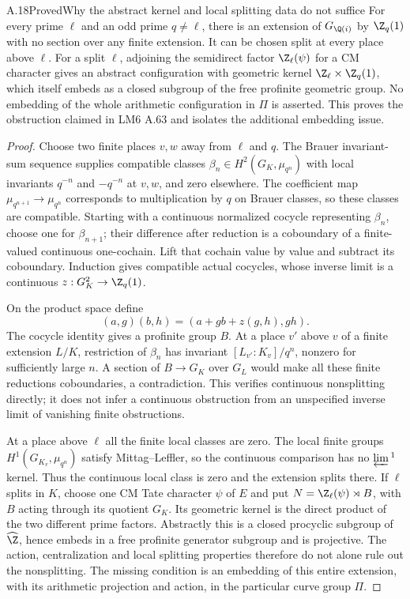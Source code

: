 \begin{statement}{A.18}{Proved}{Why the abstract kernel and local splitting data do not suffice}
For every prime $\ell$ and an odd prime $q\ne\ell$, there is
an extension of $G_{\Q(i)}$ by $\Z_q(1)$ with no section over
any finite extension. It can be chosen split at every place
above $\ell$. For a split $\ell$, adjoining the semidirect
factor $\Z_\ell(\psi)$ for a CM character gives an abstract
configuration with geometric kernel $\Z_\ell\times\Z_q(1)$,
which itself embeds as a closed subgroup of the free profinite
geometric group. No embedding of the whole arithmetic
configuration in $\Pi$ is asserted. This proves the obstruction
claimed in LM6 A.63 and isolates the additional embedding issue.
\end{statement}
\begin{proof}
Choose two finite places $v,w$ away from $\ell$ and $q$.
The Brauer invariant-sum sequence supplies compatible classes
$\beta_n\in H^2(G_K,\mu_{q^n})$ with local invariants
$q^{-n}$ and $-q^{-n}$ at $v,w$, and zero elsewhere.
The coefficient map $\mu_{q^{n+1}}\to\mu_{q^n}$ corresponds
to multiplication by $q$ on Brauer classes, so these classes
are compatible. Starting with a continuous normalized cocycle
representing $\beta_n$, choose one for $\beta_{n+1}$; their
difference after reduction is a coboundary of a finite-valued
continuous one-cochain. Lift that cochain value by value and
subtract its coboundary. Induction gives compatible actual
cocycles, whose inverse limit is a continuous
$z:G_K^2\to\Z_q(1)$.

On the product space define
\[
              (a,g)(b,h)=(a+g b+z(g,h),gh).
                                                               \tag{A.18.1}
\]
The cocycle identity gives a profinite group $B$. At a place
$v'$ above $v$ of a finite extension $L/K$, restriction of
$\beta_n$ has invariant $[L_{v'}:K_v]/q^n$, nonzero for
sufficiently large $n$. A section of $B\to G_K$ over $G_L$
would make all these finite reductions coboundaries, a
contradiction. This verifies continuous nonsplitting directly;
it does not infer a continuous obstruction from an unspecified
inverse limit of vanishing finite obstructions.

At a place above $\ell$ all the finite local classes are zero.
The local finite groups $H^1(G_{K_v},\mu_{q^n})$ satisfy
Mittag--Leffler, so the continuous comparison has no
$\varprojlim{}^1$ kernel. Thus the continuous local class is
zero and the extension splits there.
If $\ell$ splits in $K$, choose one CM Tate character $\psi$
of $E$ and put $N=\Z_\ell(\psi)\rtimes B$, with $B$ acting
through its quotient $G_K$. Its geometric kernel is the direct
product of the two different prime factors. Abstractly this is
a closed procyclic subgroup of $\widehat\Z$, hence embeds in
a free profinite generator subgroup and is projective. The
action, centralization and local splitting properties therefore
do not alone rule out the nonsplitting. The missing condition
is an embedding of this entire extension, with its arithmetic
projection and action, in the particular curve group $\Pi$.
\end{proof}

